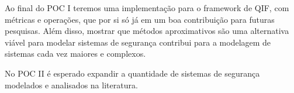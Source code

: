Ao final do POC I teremos uma implementação para o framework de QIF, com métricas e operações, que por si só já em um boa contribuição para futuras pesquisas. 
Além disso, mostrar que métodos aproximativos são uma alternativa viável para modelar sistemas de segurança contribui para a modelagem de sistemas cada vez maiores e complexos.

No POC II é esperado expandir a quantidade de sistemas de segurança modelados e analisados na literatura.